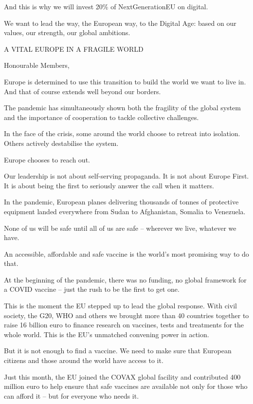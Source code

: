 \documentclass[a4paper,11pt]{article}
\begin{document}
And this is why we will invest 20\% of NextGenerationEU on digital.

We want to lead the way, the European way, to the Digital Age: based on our values, our strength, our global ambitions.

 

A VITAL EUROPE IN A FRAGILE WORLD

Honourable Members,

Europe is determined to use this transition to build the world we want to live in. And that of course extends well beyond our borders.

The pandemic has simultaneously shown both the fragility of the global system and the importance of cooperation to tackle collective challenges.

In the face of the crisis, some around the world choose to retreat into isolation. Others actively destabilise the system.

Europe chooses to reach out.

Our leadership is not about self-serving propaganda. It is not about Europe First. It is about being the first to seriously answer the call when it matters.

In the pandemic, European planes delivering thousands of tonnes of protective equipment landed everywhere from Sudan to Afghanistan, Somalia to Venezuela.

None of us will be safe until all of us are safe – wherever we live, whatever we have.

An accessible, affordable and safe vaccine is the world's most promising way to do that.

At the beginning of the pandemic, there was no funding, no global framework for a COVID vaccine – just the rush to be the first to get one.

This is the moment the EU stepped up to lead the global response. With civil society, the G20, WHO and others we brought more than 40 countries together to raise 16 billion euro to finance research on vaccines, tests and treatments for the whole world. This is the EU's unmatched convening power in action.  

But it is not enough to find a vaccine. We need to make sure that European citizens and those around the world have access to it.

Just this month, the EU joined the COVAX global facility and contributed 400 million euro to help ensure that safe vaccines are available not only for those who can afford it – but for everyone who needs it. 
\end{document}
